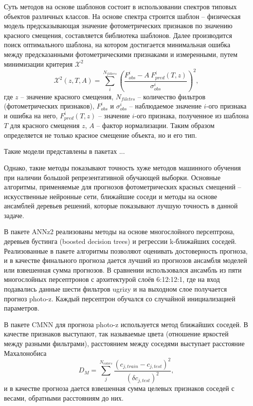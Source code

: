 \documentclass[fleqn,usenatbib]{mnras}
\newcommand{\achtung}[1]{\textcolor{red}{//#1//}}
\begin{document}
Суть методов на основе шаблонов состоит в использовании спектров типовых объектов различных классов. На основе спектра строится шаблон -- физическая модель предсказывающая значение фотометрических признаков по значению красного смещения, составляется библиотека шаблонов. Далее производится поиск оптимального шаблона, на котором достигается минимальная ошибка между предсказанными фотометрическими признаками и измеренными, путем минимизации критерия \(\mathcal{X}^2\)
\begin{equation}
    \mathcal{X}^2 (z, T, A) = \sum_i^{N_{filters}} (\frac{F_{obs}^i - A~F_{pred}^i(T, z)}{\sigma_{obs}^i})^2,
\end{equation}
где \(z\) -- значение красного смещения, \(N_{filetrs}\) -- количество фильтров (фотометрических признаков), \(F_{obs}^i\) и \(\sigma_{obs}^i\) -- наблюдаемое значение \(i\)-ого признака и ошибка на него, \(F_{pred}^i(T, z)\) -- значение \(i\)-ого признака, полученное из шаблона \(T\) для красного смещения \(z\), \(A\) -- фактор нормализации. Таким образом определяется не только красное смещение объекта, но и его тип.

Такие модели представлены в пакетах ...

Однако, такие методы показывают точность хуже методов машинного обучения при наличии большой репрезентативной обучающей выборки. Основные алгоритмы, применяемые для прогнозов фотометрических красных смещений -- искусственные нейронные сети, ближайшие соседи и методы на основе ансамблей деревьев решений, которые показывают лучшую точность в данной задаче.

В пакете ANNz2 \cite{bib:annz2} реализованы методы на основе многослойного персептрона, деревьев бустинга (boosted decision trees) и регрессии k-ближайших соседей. Реализованные в пакете алгоритмы позволяют оценивать достоверность прогноза, и в качестве финального прогноза дается лучший из прогнозов ансамбля моделей или взвешенная сумма прогнозов. В сравнении использовался ансамбль из пяти многослойных персептронов с архитектурой слоёв 6:12:12:1, где на вход подавались данные шести фильтров ugrizy и на выходном слое получается прогноз photo-z. Каждый персептрон обучался со случайной инициализацией параметров.

В пакете CMNN \cite{bib:cmnn} для прогноза photo-z используется метод ближайших соседей. В качестве признаков выступают, так называемые цвета (отношение яркостей между разными фильтрами), расстоянием между соседями выступает расстояние Махалонобиса
\begin{equation}
    D_M = \sum_j^{N_{colors}} \frac{(c_{j,train} - c_{j,test})^2}{(\delta c_{j,test})^2},
\end{equation}
и в качестве прогноза дается взвешенная сумма целевых признаков соседей с весами, обратными расстояниям до них.
\end{document}
